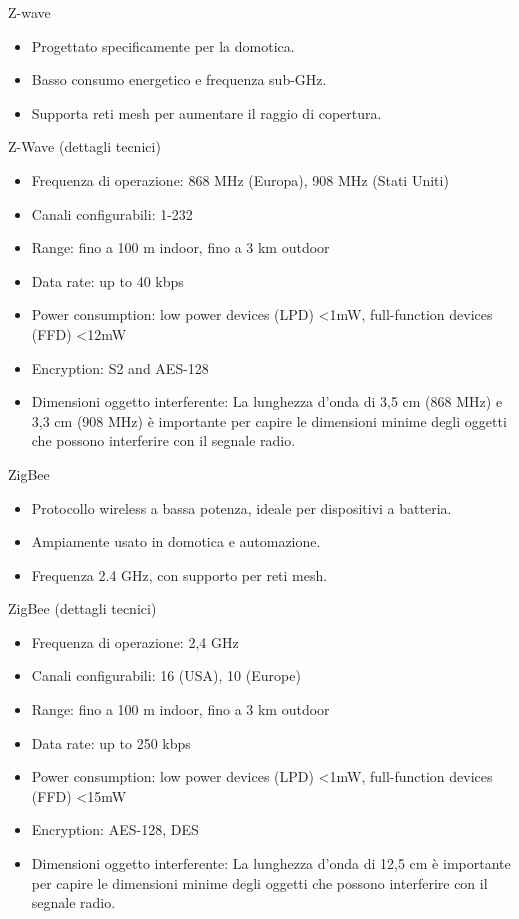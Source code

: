 \documentclass{beamer}
\begin{document}
	\begin{frame}{Z-wave}
		\begin{itemize}
			\item Progettato specificamente per la domotica.
			\item Basso consumo energetico e frequenza sub-GHz.
			\item Supporta reti mesh per aumentare il raggio di copertura.
		\end{itemize}
	\end{frame}
	\begin{frame}{Z-Wave (dettagli tecnici)}
		\begin{itemize}
			\item Frequenza di operazione: 868 MHz (Europa), 908 MHz (Stati Uniti)
			\item Canali configurabili: 1-232
			\item Range: fino a 100 m indoor, fino a 3 km outdoor
			\item Data rate: up to 40 kbps
			\item Power consumption: low power devices (LPD) <1mW, full-function devices (FFD) <12mW
			\item Encryption: S2 and AES-128
			\item Dimensioni oggetto interferente:
				La lunghezza d'onda di 3,5 cm (868 MHz) e 3,3 cm (908 MHz) è importante per capire le dimensioni minime degli oggetti che possono interferire con il segnale radio.
		\end{itemize}
	\end{frame}
	
	\begin{frame}{ZigBee}
		\begin{itemize}
			\item Protocollo wireless a bassa potenza, ideale per dispositivi a batteria.
			\item Ampiamente usato in domotica e automazione.
			\item Frequenza 2.4 GHz, con supporto per reti mesh.
		\end{itemize}
	\end{frame}
	\begin{frame}{ZigBee (dettagli tecnici)}
		\begin{itemize}
			\item Frequenza di operazione: 2,4 GHz
			\item Canali configurabili: 16 (USA), 10 (Europe)
			\item Range: fino a 100 m indoor, fino a 3 km outdoor
			\item Data rate: up to 250 kbps
			\item Power consumption: low power devices (LPD) <1mW, full-function devices (FFD) <15mW
			\item Encryption: AES-128, DES
			\item Dimensioni oggetto interferente:
				La lunghezza d'onda di 12,5 cm è importante per capire le dimensioni minime degli oggetti che possono interferire con il segnale radio.
		\end{itemize}
	\end{frame}
	
\end{document}
